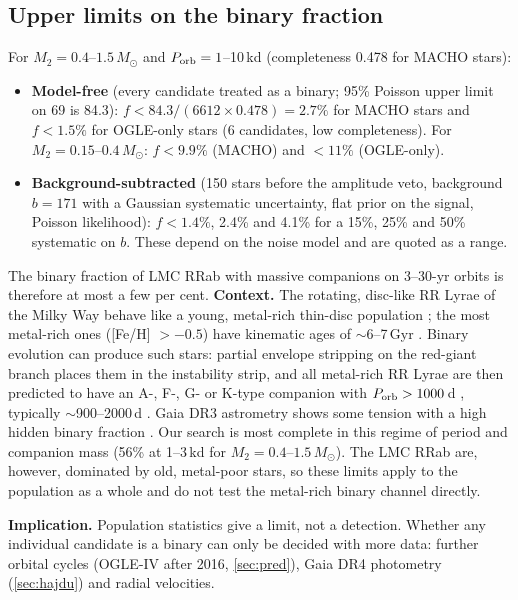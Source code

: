 \documentclass[11pt]{article}
\newcommand{\Msun}{\ensuremath{M_\odot}}
\begin{document}
\subsection{Upper limits on the binary fraction}
For $M_2=0.4$--$1.5\,\Msun$ and $P_{\rm orb}=1$--10\,kd (completeness 0.478 for MACHO stars):
\begin{itemize}[leftmargin=*]
\item \textbf{Model-free} (every candidate treated as a binary; 95\% Poisson upper limit on 69 is 84.3):
$f<84.3/(6612\times0.478)=2.7\%$ for MACHO stars and $f<1.5\%$ for OGLE-only stars (6 candidates, low completeness).
For $M_2=0.15$--$0.4\,\Msun$: $f<9.9\%$ (MACHO) and $<11\%$ (OGLE-only).
\item \textbf{Background-subtracted} (150 stars before the amplitude veto, background $b=171$ with a Gaussian systematic
uncertainty, flat prior on the signal, Poisson likelihood): $f<1.4\%$, 2.4\% and 4.1\% for a 15\%, 25\% and 50\%
systematic on $b$. These depend on the noise model and are quoted as a range.
\end{itemize}
The binary fraction of LMC RRab with massive companions on 3--30-yr orbits is therefore at most a few per cent.
\textbf{Context.} The rotating, disc-like RR Lyrae of the Milky Way behave like a young, metal-rich thin-disc population
\citep{Iorio2021}; the most metal-rich ones ([Fe/H] $>-0.5$) have kinematic ages of $\sim$6--7\,Gyr \citep{Zhang2025}. Binary
evolution can produce such stars: partial envelope stripping on the red-giant branch places them in the instability strip, and
all metal-rich RR Lyrae are then predicted to have an A-, F-, G- or K-type companion with $P_{\rm orb}>1000$\,d
\citep{Bobrick2024}, typically $\sim$900--2000\,d \citep{Iorio2026}. Gaia DR3 astrometry shows some tension with a high hidden
binary fraction \citep{Iorio2026}. Our search is most complete in this regime of period and companion mass (56\% at 1--3\,kd for
$M_2=0.4$--$1.5\,\Msun$). The LMC RRab are, however, dominated by old, metal-poor stars, so these limits apply to the population as
a whole and do not test the metal-rich binary channel directly.

\textbf{Implication.} Population statistics give a limit, not a detection. Whether any individual candidate is a binary can
only be decided with more data: further orbital cycles (OGLE-IV after 2016, \cref{sec:pred}), Gaia DR4 photometry
(\cref{sec:hajdu}) and radial velocities.

\end{document}
